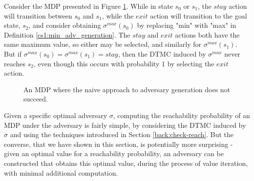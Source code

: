 \begin{example}
\label{cs1:bad_valit_example}

Consider the MDP presented in Figure \ref{cs1:bad_mdp_figure}. While in state $s_0$ or $s_1$, the $stay$ action will transition between $s_0$ and $s_1$, while the $exit$ action will transition to the goal state, $s_2$, and consider obtaining $\sigma^{max}(s_0)$ by replacing "min" with "max" in Definition \ref{cs1:min_adv_generation}. The $stay$ and $exit$ actions both have the same maximum value, so either may be selected, and similarly for $\sigma^{max}(s_1)$. But if $\sigma^{max}(s_0) = \sigma^{max}(s_1) = stay$, then the DTMC induced by $\sigma^{max}$ never reaches $s_2$, even though this occurs with probability 1 by selecting the $exit$ action.
\begin{figure}

\centering
{}
\caption{An MDP where the naive approach to adversary generation does not succeed.}
\label{cs1:bad_mdp_figure}
\end{figure}
\end{example}


Given a specific optimal adversary $\sigma$, computing the reachability probability of an MDP under the adversary is fairly simple, by considering the DTMC induced by $\sigma$ and using the techniques introduced in Section \ref{back:check-reach}. But the converse, that we have shown in this section, is potentially more surprising - given an optimal value for a reachability probability, an adversary can be constructed that obtains this optimal value, during the process of value iteration, with minimal additional computation.


